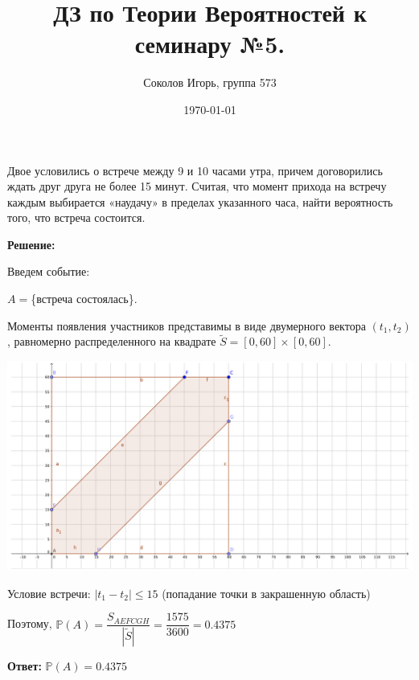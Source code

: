 \documentclass[a4paper,12pt]{article}
\author{Соколов Игорь, группа 573}
\title{ДЗ по Теории Вероятностей к семинару №5.}
\date{\today}
\newcommand{\dfr}{\dfrac}
\newcommand{\bb}{\mathbb}
\begin{document}

\maketitle



\section{}

Двое условились о встрече между 9 и 10 часами утра, причем договорились
ждать друг друга не более 15 минут. Считая, что момент прихода на встречу
каждым выбирается «наудачу» в пределах указанного часа, найти вероятность
того, что встреча состоится.

\vspace{\baselineskip}

\textbf{Решение:}

\vspace{\baselineskip}

Введем событие: 

$A = $\{встреча состоялась\}.

Моменты появления участников представимы в виде двумерного вектора $(t_1, t_2)$,
равномерно распределенного на квадрате ${\widetilde S} = [0, 60]\times[0, 60]$.

\includegraphics[width=\textwidth]{problem1.pdf}

Условие встречи: $|t_1 - t_2|\leq 15$ (попадание точки в закрашенную область)

Поэтому, $\bb P(A) = \dfr{S_{AEFCGH} }{|{\widetilde S}|} = \dfr{1575}{3600} = 0.4375$

\textbf{Ответ:} $\bb P(A) = 0.4375$

\section{}
\end{document}
